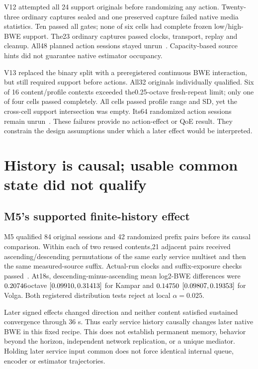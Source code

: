 \documentclass[10pt]{article}
\begin{document}
V12 attempted all 24 support originals before randomizing any action. Twenty-three
ordinary captures sealed and one preserved capture failed native media statistics.
Ten passed all gates; none of six cells had complete frozen low/high-BWE support.
The23 ordinary captures passed clocks, transport, replay and cleanup. All48
planned action sessions stayed unrun~\cite{v12}. Capacity-based source hints did
not guarantee native estimator occupancy.

V13 replaced the binary split with a preregistered continuous BWE interaction,
but still required support before actions. All32 originals individually
qualified. Six of 16 content/profile contexts exceeded the0.25-octave fresh-repeat
limit; only one of four cells passed completely. All cells passed profile range
and SD, yet the cross-cell support intersection was empty. Its64 randomized
action sessions remain unrun~\cite{v13}. These failures provide no action-effect
or QoE result. They constrain the design assumptions under which a later effect
would be interpreted.

\section{History is causal; usable common state did not qualify}
\subsection{M5's supported finite-history effect}
M5 qualified 84 original sessions and 42 randomized prefix pairs before its causal
comparison. Within each of two reused contents,21 adjacent pairs received
ascending/descending permutations of the same early service multiset and then
the same measured-source suffix. Actual-run clocks and suffix-exposure checks
passed~\cite{m5}. At18s, descending-minus-ascending mean log2-BWE differences
were $0.20746{}$octave $[0.09910{},0.31413{}]$ for Kampar
and $0.14750{}$ $[0.09807{},0.19353{}]$ for Volga. Both
registered distribution tests reject at local $\alpha=0.025$.

Later signed effects changed direction and neither content satisfied sustained
convergence through 36 s. Thus early service history causally changes later native
BWE in this fixed recipe. This does not establish permanent memory, behavior
beyond the horizon, independent network replication, or a unique mediator.
Holding later service input common does not force identical internal queue,
encoder or estimator trajectories.
\end{document}
